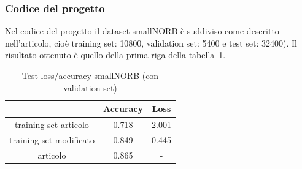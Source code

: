 \documentclass[italian,12pt,a4paper,oneside,final]{report}
\begin{document}
\subsubsection{Codice del progetto}
Nel codice del progetto il dataset smallNORB è suddiviso come descritto nell'articolo, cioè training set: 10800, validation set: 5400 e test set: 32400).
Il risultato ottenuto è quello della prima riga della tabella~\ref{tab:smallnorb_val_loss_acc_pt}.
\begin{table}[!ht]
	\centering
	\begin{tabular}[t]{|c|cc|}
		\hline
		& \textbf{Accuracy} & \textbf{Loss} \\
		\hline
		training set articolo& 0.718 & 2.001\\
		training set modificato& 0.849 & 0.445 \\
		articolo & 0.865 & - \\ 
		\hline
	\end{tabular}
	\caption{Test loss/accuracy smallNORB (con validation set)}
	\label{tab:smallnorb_val_loss_acc_pt}
\end{table}
\end{document}
